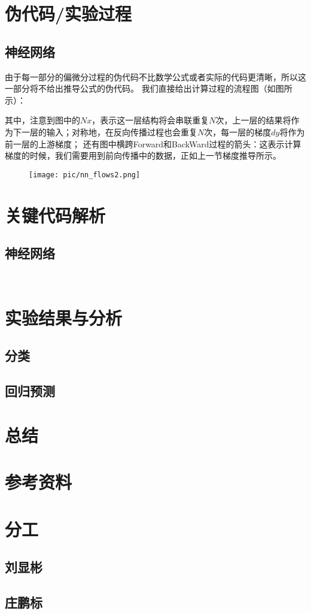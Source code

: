 \documentclass{ctexart}
\begin{document}
    \section{伪代码/实验过程}
        \subsection{神经网络}
            由于每一部分的偏微分过程的伪代码不比数学公式或者实际的代码更清晰，所以这一部分将不给出推导公式的伪代码。
            我们直接给出计算过程的流程图（如图所示）：

            其中，注意到图中的$Nx$，表示这一层结构将会串联重复$N$次，上一层的结果将作为下一层的输入；对称地，在反向传播过程也会重复$N$次，每一层的梯度$dy$将作为前一层的上游梯度；
            还有图中横跨Forward和BackWard过程的箭头：这表示计算梯度的时候，我们需要用到前向传播中的数据，正如上一节梯度推导所示。
            \begin{figure}
                \texttt{[image: pic/nn\_flows2.png]}
            \end{figure}
    \section{关键代码解析}
            \subsection{神经网络}
                \begin{lstlisting}
                    
                \end{lstlisting}
    \section{实验结果与分析}
        \subsection{分类}
        \subsection{回归预测}
    \section{总结}
    \section{参考资料}

    \section{分工}
    \subsection{刘显彬}
    \subsection{庄鹏标}
\end{document}
